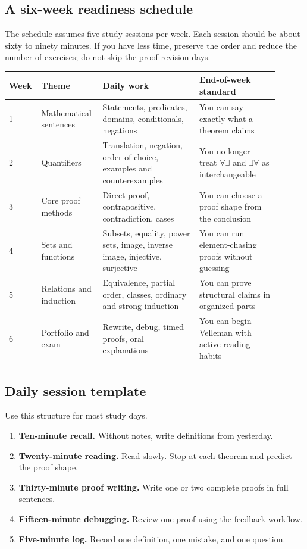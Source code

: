\subsection{A six-week readiness schedule}

The schedule assumes five study sessions per week. Each session should be about sixty to ninety minutes. If you have less time, preserve the order and reduce the number of exercises; do not skip the proof-revision days.

\begin{longtable}{p{0.08\linewidth}p{0.2\linewidth}p{0.34\linewidth}p{0.28\linewidth}}
\toprule
Week & Theme & Daily work & End-of-week standard \\
\midrule
1 & Mathematical sentences & Statements, predicates, domains, conditionals, negations & You can say exactly what a theorem claims \\
2 & Quantifiers & Translation, negation, order of choice, examples and counterexamples & You no longer treat $\forall\exists$ and $\exists\forall$ as interchangeable \\
3 & Core proof methods & Direct proof, contrapositive, contradiction, cases & You can choose a proof shape from the conclusion \\
4 & Sets and functions & Subsets, equality, power sets, image, inverse image, injective, surjective & You can run element-chasing proofs without guessing \\
5 & Relations and induction & Equivalence, partial order, classes, ordinary and strong induction & You can prove structural claims in organized parts \\
6 & Portfolio and exam & Rewrite, debug, timed proofs, oral explanations & You can begin Velleman with active reading habits \\
\bottomrule
\end{longtable}

\subsection{Daily session template}

Use this structure for most study days.

\begin{enumerate}
\item \textbf{Ten-minute recall.} Without notes, write definitions from yesterday.
\item \textbf{Twenty-minute reading.} Read slowly. Stop at each theorem and predict the proof shape.
\item \textbf{Thirty-minute proof writing.} Write one or two complete proofs in full sentences.
\item \textbf{Fifteen-minute debugging.} Review one proof using the feedback workflow.
\item \textbf{Five-minute log.} Record one definition, one mistake, and one question.
\end{enumerate}

